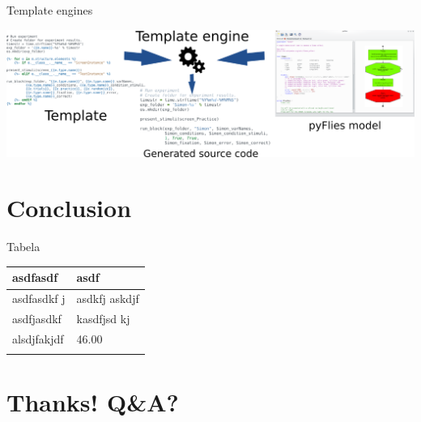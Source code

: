 \documentclass[presentation]{beamer}
\begin{document}
\begin{frame}[label={sec:org6692072}]{Template engines}
\begin{center}
\includegraphics[width=1\textwidth]{./images/template_engine.png}
\end{center} 
\end{frame}

\section*{Conclusion}
\label{sec:org5b619c2}

\begin{frame}[label={sec:orge95e1ed}]{Tabela}
\begin{center}
\begin{tabular}{ll}
asdfasdf & asdf\\
\hline
asdfasdkf j & asdkfj askdjf\\
asdfjasdkf & kasdfjsd kj\\
\hline
alsdjfakjdf & 46.00\\
 & \\
\end{tabular}
\end{center}
\end{frame}


\section*{Thanks! Q\&A?}
\label{sec:org25bf9d8}
\end{document}
